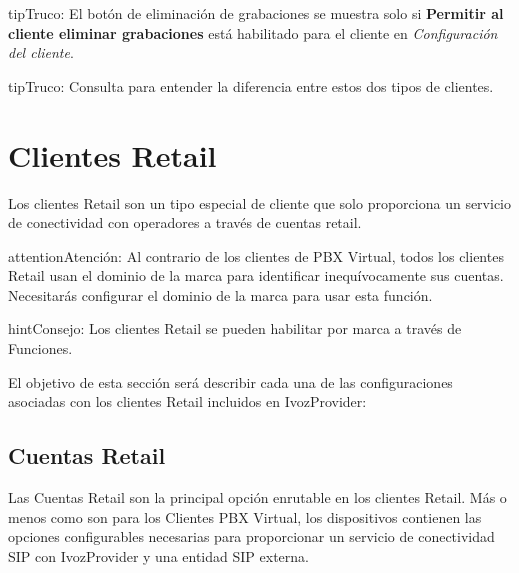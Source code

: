 \documentclass[letterpaper,10pt,spanish]{sphinxmanual}
\begin{document}
\begin{notice}{tip}{Truco:}
El botón de eliminación de grabaciones se muestra solo si \textbf{Permitir al cliente eliminar grabaciones} está habilitado para el cliente en \emph{Configuración del cliente}.
\end{notice}

\begin{notice}{tip}{Truco:}
Consulta {\hyperref[administration_portal/brand/clients/retail:differences\string-between\string-retail\string-and\string-residential\string-clients]{}} para entender la diferencia entre estos dos tipos de clientes.
\end{notice}
\label{administration_portal/client/retail/index:retail-clients}

\section{Clientes Retail}
\label{administration_portal/client/retail/index:retail-clients}\label{administration_portal/client/retail/index:clientes-retail}\label{administration_portal/client/retail/index::doc}\label{administration_portal/client/retail/index:id1}
Los clientes Retail son un tipo especial de cliente que solo proporciona un servicio de conectividad con operadores a través de cuentas retail.

\begin{notice}{attention}{Atención:}
Al contrario de los clientes de PBX Virtual, todos los clientes Retail usan el dominio de la marca para identificar inequívocamente sus cuentas. Necesitarás configurar el dominio de la marca para usar esta función.
\end{notice}

\begin{notice}{hint}{Consejo:}
Los clientes Retail se pueden habilitar por marca a través de Funciones.
\end{notice}

El objetivo de esta sección será describir cada una de las configuraciones asociadas con los clientes Retail incluidos en IvozProvider:


\subsection{Cuentas Retail}
\label{administration_portal/client/retail/retail_accounts::doc}\label{administration_portal/client/retail/retail_accounts:retail-accounts}\label{administration_portal/client/retail/retail_accounts:id1}
Las Cuentas Retail son la principal opción enrutable en los clientes Retail. Más o menos como {\hyperref[administration_portal/client/vpbx/routing_endpoints/friends/index:friends]{}} son para los Clientes PBX Virtual, los dispositivos contienen las opciones configurables necesarias para proporcionar un servicio de conectividad SIP con IvozProvider y una entidad SIP externa.
\end{document}
